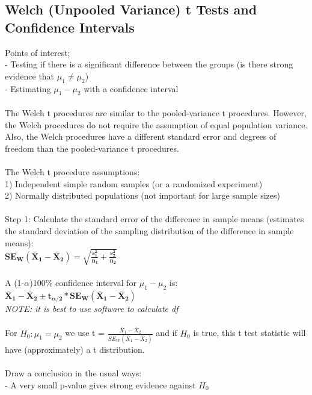 \documentclass[12pt, a4paper]{article}
\begin{document}
	\subsection{Welch (Unpooled Variance) t Tests and Confidence Intervals}
	Points of interest; \\
	- Testing if there is a significant difference between the groups (is there strong evidence that \hspace*{2mm} $\mu_1 \neq \mu_2$) \\
	- Estimating $\mu_1 - \mu_2$ with a confidence interval \\~\\
	The Welch t procedures are similar to the pooled-variance t procedures. However, the Welch procedures do not require the assumption of equal population variance. Also, the Welch procedures have a different standard error and degrees of freedom than the pooled-variance t procedures. \\~\\
	The Welch t procedure assumptions: \\
	1) Independent simple random samples (or a randomized experiment) \\
	2) Normally distributed populations (not important for large sample sizes) \\~\\
	Step 1: Calculate the standard error of the difference in sample means (estimates the standard \hspace*{13.5mm} deviation of the sampling distribution of the difference in sample means): \\
	\hspace*{13.5mm} $\bm{SE_W(\bar{X}_1 - \bar{X}_2) = \sqrt{\frac{s_1^2}{n_1} + \frac{s_2^2}{n_2}}}$ \\~\\
	A (1-$\alpha$)100\% confidence interval for $\mu_1 - \mu_2$ is: \\
	$\bm{\bar{X}_1 - \bar{X}_2 \pm t_{\alpha/2} * SE_W(\bar{X}_1 - \bar{X}_2)}$ \\ \textit{NOTE: it is best to use software to calculate df} \\~\\
	For $H_0: \mu_1 = \mu_2$ we use t = $\frac{\bar{X}_1 - \bar{X}_2}{SE_W(\bar{X}_1 - \bar{X}_2)}$ and if $H_0$ is true, this t test statistic will have (approximately) a t distribution. \\~\\
	Draw a conclusion in the usual ways: \\
	- A very small p-value gives strong evidence against $H_0$ \\
\end{document}
